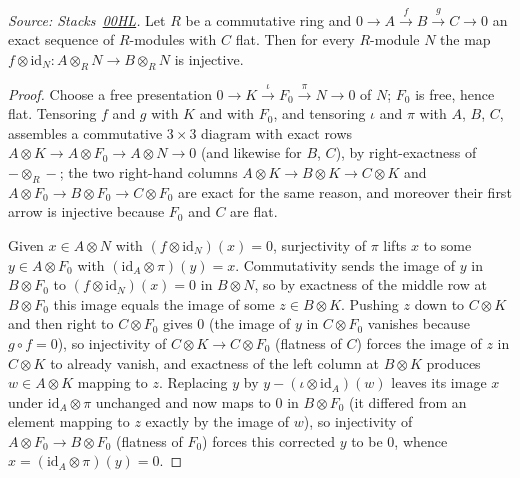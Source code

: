 \begin{lemma}\leanok
  \label{lem:flat_cokernel_rTensor_injective}
  \textit{Source: Stacks~\href{https://stacks.math.columbia.edu/tag/00HL}{00HL}.}
  Let \(R\) be a commutative ring and \(0 \to A \xrightarrow{f} B
  \xrightarrow{g} C \to 0\) an exact sequence of \(R\)-modules with \(C\)
  flat. Then for every \(R\)-module \(N\) the map
  \(f \otimes \mathrm{id}_N : A \otimes_R N \to B \otimes_R N\) is injective.
\end{lemma}
\begin{proof}\leanok
  Choose a free presentation \(0 \to K \xrightarrow{\iota} F_0
  \xrightarrow{\pi} N \to 0\) of \(N\); \(F_0\) is free, hence flat.
  Tensoring \(f\) and \(g\) with \(K\) and with \(F_0\), and tensoring
  \(\iota\) and \(\pi\) with \(A\), \(B\), \(C\), assembles a commutative
  \(3 \times 3\) diagram with exact rows
  \(A \otimes K \to A \otimes F_0 \to A \otimes N \to 0\) (and likewise for
  \(B\), \(C\)), by right-exactness of \(- \otimes_R -\); the two right-hand
  columns \(A \otimes K \to B \otimes K \to C \otimes K\) and
  \(A \otimes F_0 \to B \otimes F_0 \to C \otimes F_0\) are exact for the
  same reason, and moreover their first arrow is injective because \(F_0\)
  and \(C\) are flat.

  Given \(x \in A \otimes N\) with \((f \otimes \mathrm{id}_N)(x) = 0\),
  surjectivity of \(\pi\) lifts \(x\) to some \(y \in A \otimes F_0\) with
  \((\mathrm{id}_A \otimes \pi)(y) = x\). Commutativity sends the image of
  \(y\) in \(B \otimes F_0\) to \((f \otimes \mathrm{id}_N)(x) = 0\) in
  \(B \otimes N\), so by exactness of the middle row at \(B \otimes F_0\)
  this image equals the image of some \(z \in B \otimes K\). Pushing \(z\)
  down to \(C \otimes K\) and then right to \(C \otimes F_0\) gives \(0\)
  (the image of \(y\) in \(C \otimes F_0\) vanishes because
  \(g \circ f = 0\)), so injectivity of \(C \otimes K \to C \otimes F_0\)
  (flatness of \(C\)) forces the image of \(z\) in \(C \otimes K\) to
  already vanish, and exactness of the left column at \(B \otimes K\)
  produces \(w \in A \otimes K\) mapping to \(z\). Replacing \(y\) by
  \(y - (\iota \otimes \mathrm{id}_A)(w)\) leaves its image \(x\) under
  \(\mathrm{id}_A \otimes \pi\) unchanged and now maps to \(0\) in
  \(B \otimes F_0\) (it differed from an element mapping to \(z\) exactly by
  the image of \(w\)), so injectivity of \(A \otimes F_0 \to B \otimes F_0\)
  (flatness of \(F_0\)) forces this corrected \(y\) to be \(0\), whence
  \(x = (\mathrm{id}_A \otimes \pi)(y) = 0\).
\end{proof}

